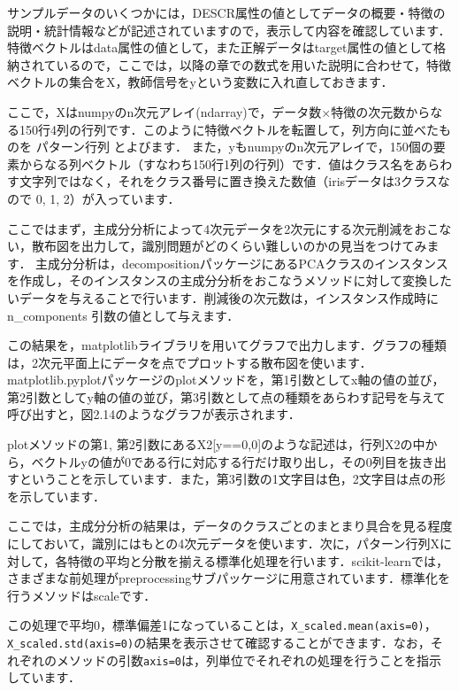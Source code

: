 サンプルデータのいくつかには，DESCR属性の値としてデータの概要・特徴の説明・統計情報などが記述されていますので，表示して内容を確認しています．
特徴ベクトルはdata属性の値として，また正解データはtarget属性の値として格納されているので，ここでは，以降の章での数式を用いた説明に合わせて，特徴ベクトルの集合をX，教師信号をyという変数に入れ直しておきます．

ここで，Xはnumpyのn次元アレイ(ndarray)で，データ数$\times$特徴の次元数からなる150行4列の行列です．このように特徴ベクトルを転置して，列方向に並べたものを
パターン行列
とよびます．
また，yもnumpyのn次元アレイで，150個の要素からなる列ベクトル（すなわち150行1列の行列）です．値はクラス名をあらわす文字列ではなく，それをクラス番号に置き換えた数値（irisデータは3クラスなので 0, 1, 2）が入っています．

ここではまず，主成分分析によって4次元データを2次元にする次元削減をおこない，散布図を出力して，識別問題がどのくらい難しいのかの見当をつけてみます．
主成分分析は，decompositionパッケージにあるPCAクラスのインスタンスを作成し，そのインスタンスの主成分分析をおこなうメソッドに対して変換したいデータを与えることで行います．削減後の次元数は，インスタンス作成時に n\_components 引数の値として与えます．

この結果を，matplotlibライブラリを用いてグラフで出力します．グラフの種類は，2次元平面上にデータを点でプロットする散布図を使います．
matplotlib.pyplotパッケージのplotメソッドを，第1引数としてx軸の値の並び，第2引数としてy軸の値の並び，第3引数として点の種類をあらわす記号を与えて呼び出すと，図2.14のようなグラフが表示されます．


plotメソッドの第1, 第2引数にあるX2[y==0,0]のような記述は，行列X2の中から，ベクトルyの値が0である行に対応する行だけ取り出し，その0列目を抜き出すということを示しています．また，第3引数の1文字目は色，2文字目は点の形を示しています．

ここでは，主成分分析の結果は，データのクラスごとのまとまり具合を見る程度にしておいて，識別にはもとの4次元データを使います．次に，パターン行列Xに対して，各特徴の平均と分散を揃える標準化処理を行います．scikit-learnでは，さまざまな前処理がpreprocessingサブパッケージに用意されています．標準化を行うメソッドはscaleです．

この処理で平均0，標準偏差1になっていることは，\texttt{X\_scaled.mean(axis=0)}，\texttt{X\_scaled.std(axis=0)}の結果を表示させて確認することができます．なお，それぞれのメソッドの引数\texttt{axis=0}は，列単位でそれぞれの処理を行うことを指示しています．

